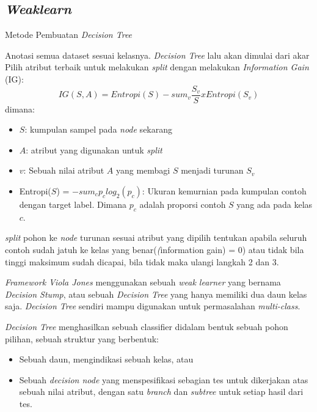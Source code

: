 \subsection{\emph{Weaklearn}}

\begin{algorithm}
  \caption{Metode Pembuatan \textit{Decision Tree}}
  \begin{algorithmic} [1]
    \State Anotasi semua dataset sesuai kelasnya. \textit{Decision Tree} lalu 
    akan dimulai dari akar
    \State Pilih atribut terbaik untuk melakukan \textit{split} dengan melakukan 
    \emph{Information Gain} (IG):
    \begin{equation}
      IG(S, A) = Entropi(S) - sum_v \frac{S_v}{S} x Entropi(S_v)
    \end{equation} 
    dimana:
    \begin{itemize}
      \item $S$: kumpulan sampel pada \emph{node} sekarang
      \item $A$: atribut yang digunakan untuk \textit{split}
      \item $v$: Sebuah nilai atribut $A$ yang membagi $S$ menjadi turunan $S_v$
      \item Entropi($S$) = $-sum_c p_c log_2(p_c)$: Ukuran kemurnian pada kumpulan 
      contoh dengan target label. Dimana $p_c$ adalah proporsi contoh $S$ yang ada 
      pada kelas $c$. 
    \end{itemize}
    \State \textit{split} pohon ke \textit{node} turunan sesuai atribut yang dipilih 
    \State tentukan apabila seluruh contoh sudah jatuh ke kelas yang benar(\textit(information gain) = 0) 
    atau tidak bila tinggi maksimum sudah dicapai, bila tidak 
    maka ulangi langkah 2 dan 3.
  \end{algorithmic}
\end{algorithm}

\emph{Framework Viola Jones} menggunakan sebuah \emph{weak learner} yang bernama 
\emph{Decision Stump}, atau sebuah \emph{Decision Tree} yang hanya memiliki 
dua daun kelas saja. \emph{Decision Tree} sendiri mampu digunakan untuk 
permasalahan \emph{multi-class}.

\emph{Decision Tree} menghasilkan sebuah classifier didalam bentuk sebuah pohon 
pilihan, sebuah struktur yang berbentuk:
\begin{itemize}
  \item Sebuah daun, mengindikasi sebuah kelas, atau
  \item Sebuah \emph{decision node} yang menspesifikasi 
  sebagian tes untuk dikerjakan atas sebuah nilai 
  atribut, dengan satu \emph{branch} dan \emph{subtree} untuk 
  setiap hasil dari tes.
\end{itemize}

